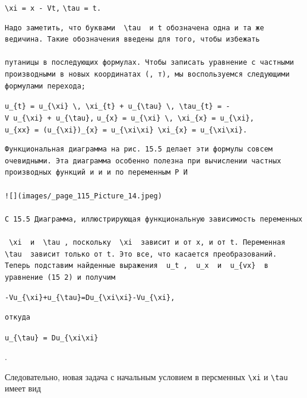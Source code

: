 \documentclass[
  ukrainian,
]{article}
\begin{document}
\texttt{\textbackslash{}xi\ =\ x\ -\ Vt,}
\texttt{\textbackslash{}tau\ =\ t.}

\begin{verbatim}
Надо заметить, что буквами  \tau  и t обозначена одна и та же ведичина. Такие обозначения введены для того, чтобы избежать

путаницы в последующих формулах. Чтобы записать уравнение с частными производными в новых координатах (, т), мы воспользуемся следующими формулами перехода;
\end{verbatim}

\texttt{u\_\{t\}\ =\ u\_\{\textbackslash{}xi\}\ \textbackslash{},\ \textbackslash{}xi\_\{t\}\ +\ u\_\{\textbackslash{}tau\}\ \textbackslash{},\ \textbackslash{}tau\_\{t\}\ =\ -V\ u\_\{\textbackslash{}xi\}\ +\ u\_\{\textbackslash{}tau\},}
\texttt{u\_\{x\}\ =\ u\_\{\textbackslash{}xi\}\ \textbackslash{},\ \textbackslash{}xi\_\{x\}\ =\ u\_\{\textbackslash{}xi\},}
\texttt{u\_\{xx\}\ =\ (u\_\{\textbackslash{}xi\})\_\{x\}\ =\ u\_\{\textbackslash{}xi\textbackslash{}xi\}\ \textbackslash{}xi\_\{x\}\ =\ u\_\{\textbackslash{}xi\textbackslash{}xi\}.}

\begin{verbatim}
Функциональная диаграмма на рис. 15.5 делает эти формулы совсем очевидными. Эта диаграмма особенно полезна при вычислении частных производных функций и и и по переменным Р И

![](images/_page_115_Picture_14.jpeg)

С 15.5 Диаграмма, иллюстрирующая функциональную зависимость переменных

 \xi  и  \tau , поскольку  \xi  зависит и от x, и от t. Переменная  \tau  зависит только от t. Это все, что касается преобразований. Теперь подставим найденные выражения  u_t ,  u_x  и  u_{vx}  в уравнение (15 2) и получим
\end{verbatim}

\texttt{-Vu\_\{\textbackslash{}xi\}+u\_\{\textbackslash{}tau\}=Du\_\{\textbackslash{}xi\textbackslash{}xi\}-Vu\_\{\textbackslash{}xi\},}

\begin{verbatim}
откуда
\end{verbatim}

\texttt{u\_\{\textbackslash{}tau\}\ =\ Du\_\{\textbackslash{}xi\textbackslash{}xi\}}

.

Следовательно, новая задача с начальным условием в персменных
\texttt{\textbackslash{}xi} и \texttt{\textbackslash{}tau} имеет вид
\end{document}

